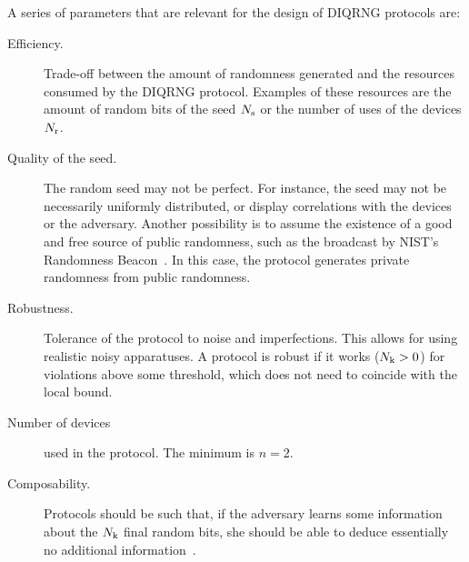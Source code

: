 \documentclass[11pt,a4paper]{article}
\begin{document}
A series of parameters that are relevant for the design of DIQRNG protocols are:
\begin{description}

    \item[Efficiency.] Trade-off between the amount of randomness generated and the resources consumed by the DIQRNG protocol. Examples of these resources are the amount of random bits of the seed $N_{\rm s}$ or the number of uses of the devices $N_{\rm r}$.

    \item[Quality of the seed.]
    The random seed may not be perfect. For instance, the seed may not be necessarily uniformly distributed, or display correlations with the devices or the adversary. Another possibility is to assume the existence of a good and free source of public randomness, such as the broadcast by NIST's Randomness Beacon~\cite{NIST}. In this case, the protocol generates private randomness from public randomness. %

    \item[Robustness.] Tolerance of the protocol to noise and imperfections. This allows for using realistic noisy apparatuses. %
A protocol is robust if it works ($N_{\rm k} >0$) for violations above some threshold, which does not need to coincide with the local bound.

    \item[Number of devices]used in the protocol. The minimum is $n=2$.


    \item[Composability.]
    Protocols should be such that, if the adversary learns some information about the $N_{\rm k}$ final random bits, she should be able to deduce essentially no additional information~\cite{ucomp}.




\end{description}
\end{document}

